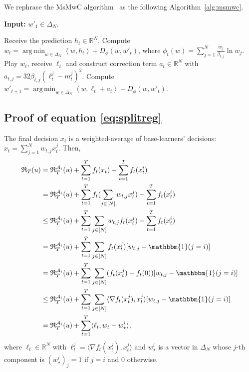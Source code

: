 \documentclass{article}
\theoremstyle{plain}
\theoremstyle{definition}
\theoremstyle{remark}
\DeclareMathOperator*{\argmin}{arg\,min}
\newcommand{\cA}{\mathcal{A}}
\newcommand{\regret}{\mathfrak{R}}
\newcommand{\real}{\mathbb{R}}
\newcommand{\inner}[2]{\left\langle #1, #2 \right\rangle}
\begin{document}
We rephrase the MsMwC algorithm~\cite{chen2021impossible} as the following Algorithm~\ref{alg:msmwc}.
\begin{algorithm}[!t]
\caption{Multi-scale Multiplicative-weight with Correction (MsMwC)}\label{alg:msmwc}
\textbf{Input:} $w'_1\in\Delta_N$.
\begin{algorithmic}[1]
\STATE Receive the prediction $h_t\in\real^N$.
\STATE Compute $w_t=\argmin_{w\in\Delta_N}\inner{w}{h_t}+D_{\phi}(w,w'_t)$, where $\phi_t(w)=\sum_{j=1}^N \frac{w_j}{\beta_{t,j}}\ln w_j$.
\STATE Play $w_t$, receive $\ell_t$ and construct correction term $a_t\in\real^N$ with $a_{t,j}=32\beta_{t,j}(\ell_t^j-m_t^j)^2$.
\STATE Compute $w'_{t+1}=\argmin_{w\in\Delta_N}\inner{w}{\ell_t+a_t}+D_{\phi}(w,w'_t)$.
\ENDFOR
\end{algorithmic}
\end{algorithm}

\subsection{Proof of equation \eqref{eq:splitreg}}\label{app:splitreg}
The final decision $x_{t}$ is a weighted-average of base-learners' decisions: $
x_{t} = \sum_{j=1}^N w_{t,j} x_{t}^j$.
Then,
\begin{align*}
\regret_T(u)&=\regret_T^{\cA_i}(u)+\sum_{t=1}^T f_t(x_t) - \sum_{t=1}^T f_t(x_t^i)\\
&=\regret_T^{\cA_i}(u)+\sum_{t=1}^T f_t(\sum_{j\in[N]}w_{t,j} x_t^j)-\sum_{t=1}^T f_t(x_t^i)\\
&\leq \regret_T^{\cA_i}(u)+\sum_{t=1}^T \sum_{j\in[N]}w_{t,j} f_t(x_t^j)-\sum_{t=1}^T f_t(x_t^i)\\
&=\regret_T^{\cA_i}(u)+\sum_{t=1}^T \sum_{j\in[N]} f_t(x_t^j)[w_{t,j}-\mathbbm{1}(j=i)]\\
&=\regret_T^{\cA_i}(u)+\sum_{t=1}^T\sum_{j\in[N]} (f_t(x_t^j) - f_t(0))[w_{t,j}-\mathbbm{1}(j=i)]\\
&\leq \regret_T^{\cA_i}(u)+\sum_{t=1}^T \sum_{j\in[N]} \langle \nabla f_t(x_t^j),x_t^j\rangle[w_{t,j}-\mathbbm{1}(j=i)]\\
&=\regret_T^{\cA_i}(u)+\sum_{t=1}^T\langle \ell_t, w_t-w_\star^i\rangle,
\end{align*}
where $\ell_t\in\mathbb{R}^N$ with $\ell_t^j=\langle \nabla f_t(x_t^j),x_t^j\rangle$ and $w_{\star}^i$ is a  vector in $\Delta_N$ whose $j$-th component is $(w_{\star}^i)_j=1$ if $j=i$ and $0$ otherwise.  
\end{document}
